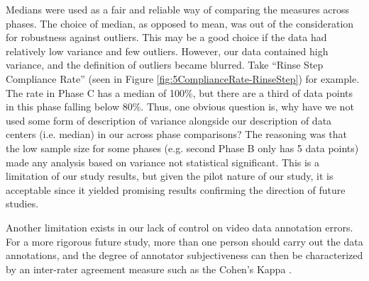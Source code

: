 Medians were used as a fair and reliable way of comparing the measures across phases.  The choice of median, as opposed to mean, was out of the consideration for robustness against outliers.  This may be a good choice if the data had relatively low variance and few outliers.  However, our data contained high variance, and the definition of outliers became blurred.  Take ``Rinse Step Compliance Rate'' (seen in Figure \ref{fig:5ComplianceRate-RinseStep}) for example.  The rate in Phase C has a median of 100\%, but there are a third of data points in this phase falling below 80\%.  Thus, one obvious question is, why have we not used some form of description of variance alongside our description of data centers (i.e. median) in our across phase comparisons?  The reasoning was that the low sample size for some phases (e.g. second Phase B only has 5 data points) made any analysis based on variance not statistical significant.  This is a limitation of our study results, but given the pilot nature of our study, it is acceptable since it yielded promising results confirming the direction of future studies.

Another limitation exists in our lack of control on video data annotation errors.  For a more rigorous future study, more than one person should carry out the data annotations, and the degree of annotator subjectiveness can then be characterized by an inter-rater agreement measure such as the Cohen's Kappa \cite{volkmar2005handbook}.

